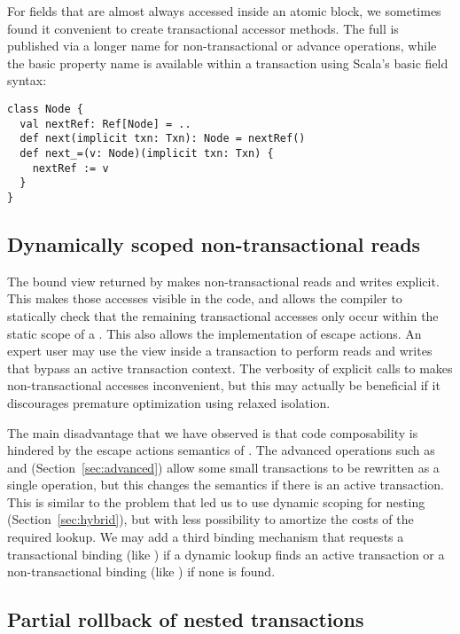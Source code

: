 For fields that are almost always accessed inside an atomic block, we
sometimes found it convenient to create transactional accessor methods.
The full  is published via a longer name for non-transactional
or advance operations, while the basic property name is available within
a transaction using Scala's basic field syntax:
\lstset{numbers=none}
\lstset{xleftmargin=0.125in}
\begin{lstlisting}
class Node {
  val nextRef: Ref[Node] = ..
  def next(implicit txn: Txn): Node = nextRef()
  def next_=(v: Node)(implicit txn: Txn) {
    nextRef := v 
  }
}
\end{lstlisting}
\lstset{xleftmargin=0.25in}
\lstset{numbers=left}

\subsection{Dynamically scoped non-transactional reads}

The bound view returned by  makes
non-transactional reads and writes explicit.  This makes those accesses
visible in the code, and allows the compiler to statically check that
the remaining transactional accesses only occur within the static scope
of a .  This also allows the implementation of escape actions.
An expert user may use the  view inside a transaction to
perform reads and writes that bypass an active transaction context.
The verbosity of explicit calls to  makes non-transactional
accesses inconvenient, but this may actually be beneficial if it discourages
premature optimization using relaxed isolation.

The main disadvantage that we have observed is that code composability is
hindered by the escape actions semantics of .  The advanced
 operations such as  and 
(Section~\ref{sec:advanced}) allow some small transactions to be
rewritten as a single operation, but this changes the semantics if
there is an active transaction.  This is similar to the problem that
led us to use dynamic scoping for nesting (Section~\ref{sec:hybrid}),
but with less possibility to amortize the costs of the required
 lookup.  We may add a third binding mechanism that
requests a transactional binding (like ) if a
dynamic lookup finds an active transaction or a non-transactional binding
(like ) if none is found.

\subsection{Partial rollback of nested transactions}

